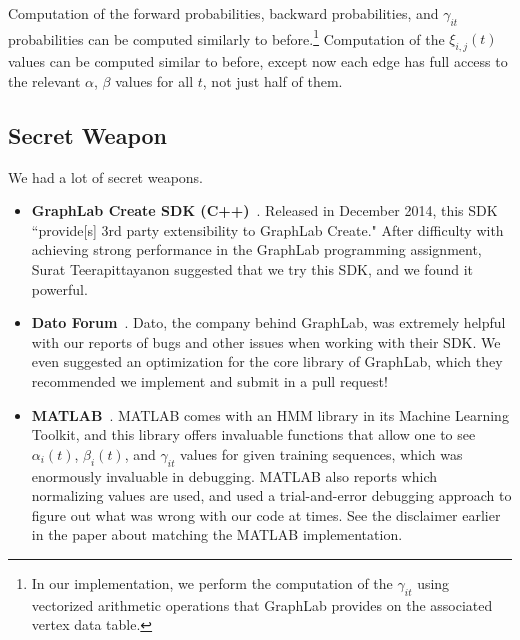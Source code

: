 Computation of the forward probabilities, backward probabilities, and
$\gamma_{it}$ probabilities can be computed similarly to before.\footnote{In our
    implementation, we perform the computation of the $\gamma_{it}$ using
vectorized arithmetic operations that GraphLab provides on the associated vertex
data table.}  Computation of the $\xi_{i, j}(t)$ values can be computed similar to before, except now each edge has full access to the relevant $\alpha$, $\beta$ values for all $t$, not just half of them.

\subsection{Secret Weapon}

We had a lot of secret weapons. 

\begin{itemize}
    \item \textbf{GraphLab Create SDK (C++)}~\cite{graphlab-create}.  Released in December 2014, this SDK ``provide[s] 3rd party extensibility to GraphLab Create."  After difficulty with achieving strong performance in the GraphLab programming assignment, Surat Teerapittayanon suggested that we try this SDK, and we found it powerful.

    \item \textbf{Dato Forum}~\cite{datoforum}.  Dato, the company behind GraphLab, was extremely helpful with our reports of bugs and other issues when working with their SDK.  We even suggested an optimization for the core library of GraphLab, which they recommended we implement and submit in a pull request!

\item \textbf{MATLAB}~\cite{matlab}.  MATLAB comes with an HMM library in its Machine Learning Toolkit, and this library offers invaluable functions that allow one to see $\alpha_i(t)$, $\beta_i(t)$,  and $\gamma_{it}$ values for given training sequences, which was enormously invaluable in debugging.  MATLAB also reports which normalizing values are used, and used a trial-and-error debugging approach to figure out what was wrong with our code at times.  See the disclaimer earlier in the paper about matching the MATLAB implementation. 
\end{itemize}
